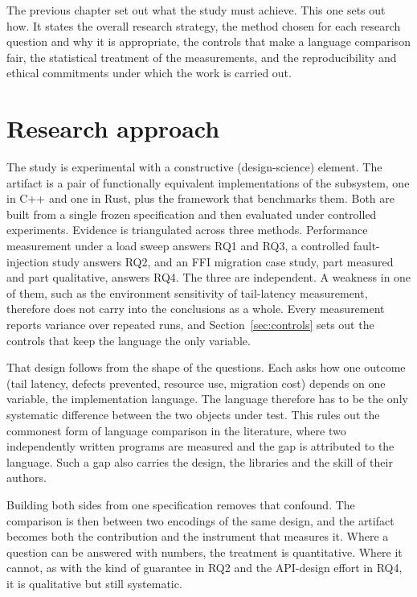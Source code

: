 \documentclass[english,oneside,a4paper,censored,csm,software-track-2020]{HYthesisML}
\begin{document}
The previous chapter set out what the study must achieve. This one sets out how. It states
the overall research strategy, the method chosen for each research question and why it is
appropriate, the controls that make a language comparison fair, the statistical treatment of
the measurements, and the reproducibility and ethical commitments under which the work is
carried out.

\section{Research approach}\label{sec:approach}
The study is experimental with a constructive (design-science) element. The artifact is a pair
of functionally equivalent implementations of the subsystem, one in C++ and one in Rust, plus
the framework that benchmarks them. Both are built from a single frozen specification and then
evaluated under controlled experiments. Evidence is triangulated across three methods.
Performance measurement under a load sweep answers RQ1 and RQ3, a controlled fault-injection
study answers RQ2, and an FFI migration case study, part measured and part qualitative, answers
RQ4. The three are independent. A weakness in one of them, such as the environment sensitivity
of tail-latency measurement, therefore does not carry into the conclusions as a whole. Every
measurement reports variance over repeated runs, and Section~\ref{sec:controls} sets out the
controls that keep the language the only variable.

That design follows from the shape of the questions. Each asks how one outcome (tail latency,
defects prevented, resource use, migration cost) depends on one variable, the implementation
language. The language therefore has to be the only systematic difference between the two
objects under test. This rules out the commonest form of language comparison in the literature,
where two independently written programs are measured and the gap is attributed to the language.
Such a gap also carries the design, the libraries and the skill of their authors.

Building both sides from one specification removes that confound. The comparison is then between
two encodings of the same design, and the artifact becomes both the contribution and the
instrument that measures it. Where a question can be answered with numbers, the treatment is
quantitative. Where it cannot, as with the kind of guarantee in RQ2 and the API-design effort in
RQ4, it is qualitative but still systematic.
\end{document}
